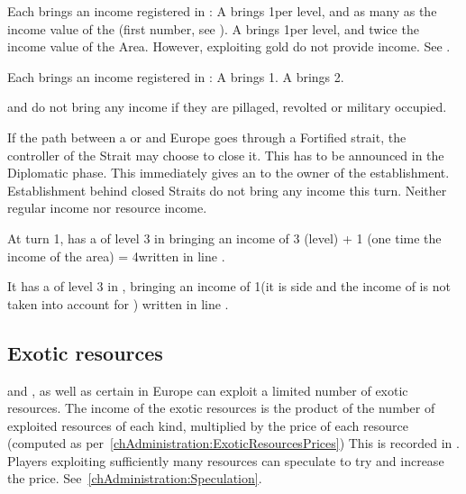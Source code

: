 \aparag Each \COL brings an income registered in :
\bparag A \COL\facemoins brings 1\ducats per level, and as many \ducats
as the income value of the \Area (first number, see
).
\bparag A \COL\faceplus brings 1\ducats per level, and twice the income
value of the Area.
\bparag However, \COL exploiting gold do not provide income. See
.

\aparag Each \TP brings an income registered in :
\bparag A \TP\facemoins brings 1\ducats.
\bparag A \TP\faceplus brings 2\ducats.

\aparag \COL and \TP do not bring any income if they are pillaged,
revolted or military occupied.

\aparag[] [BLP] If the path between a \COL or \TP and Europe goes
through a Fortified strait, the controller of the Strait may choose to
close it.
\bparag This has to be announced in the Diplomatic phase. This
immediately gives an \OCB to the owner of the establishment.
\bparag Establishment behind closed Straits do not bring any income
this turn. Neither regular income nor resource income.

\begin{exemple}
  At turn 1, \POR has a \COL of level 3 in 
  bringing an income of 3 (level) + 1 (one time the income of the
   area) = 4\ducats written in line
  .

  It has a \TP of level 3 in , bringing an income
  of 1\ducats (it is side \Facemoins and the income of
  \granderegionCotedor is not taken into account for \TP) written in
  line .
\end{exemple}

\subsection{Exotic resources}
\label{chIncomes:Exotic ressources}
\aparag \COL and \TP, as well as certain \MNU in Europe can exploit a
limited number of exotic resources.
\bparag The income of the exotic resources is the product of the number
of exploited resources of each kind, multiplied by the price of each
resource (computed as per~\ref{chAdministration:ExoticResourcesPrices})
\bparag This is recorded in .
\bparag Players exploiting sufficiently many resources can speculate
to try and increase the price. See~\ref{chAdministration:Speculation}.

